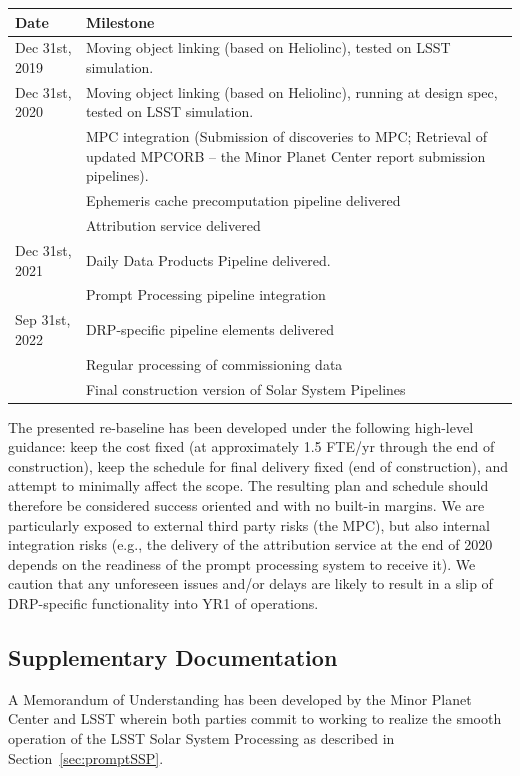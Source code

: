 \documentclass[DM,authoryear,toc]{lsstdoc}
\begin{document}
	\begin{tabular}{ p{1.5in}p{4.5in} } 
		\hline
		Date & Milestone \\
		\hline
		\hline
		Dec 31st, 2019 & Moving object linking (based on Heliolinc), tested on LSST simulation. \\ 
		Dec 31st, 2020 & Moving object linking (based on Heliolinc), running at design spec, tested on LSST simulation. \\ 
			       & MPC integration (Submission of discoveries to MPC; Retrieval of updated MPCORB -- the Minor Planet Center report submission pipelines). \\
		               & Ephemeris cache precomputation pipeline delivered \\
		               & Attribution service delivered \\
		Dec 31st, 2021 & Daily Data Products Pipeline delivered. \\
		               & Prompt Processing pipeline integration \\
		Sep 31st, 2022 & DRP-specific pipeline elements delivered \\
		               & Regular processing of commissioning data \\
		               & Final construction version of Solar System Pipelines \\
		\hline
	\end{tabular}

The presented re-baseline has been developed under the following high-level guidance: keep the cost fixed (at approximately 1.5 FTE/yr through the end of construction), keep the schedule for final delivery fixed (end of construction), and attempt to minimally affect the scope. The resulting plan and schedule should therefore be considered success oriented and with no built-in margins. We are particularly exposed to external third party risks (the MPC), but also internal integration risks (e.g., the delivery of the attribution service at the end of 2020 depends on the readiness of the prompt processing system to receive it). We caution that any unforeseen issues and/or delays are likely to result in a slip of DRP-specific functionality into YR1 of operations.

\subsection{Supplementary Documentation}

A Memorandum of Understanding has been developed by the Minor Planet Center and LSST wherein both parties commit to working to realize the smooth operation of the LSST Solar System Processing as described in Section~\ref{sec:promptSSP}.


\end{document}
